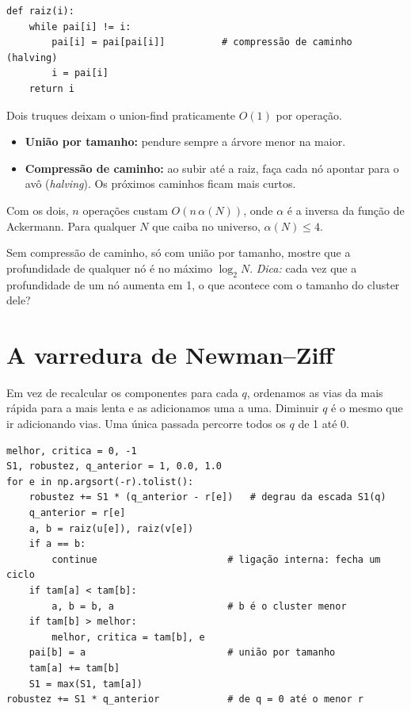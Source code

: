 \documentclass[11pt]{article}
\begin{document}
\begin{lstlisting}
def raiz(i):
    while pai[i] != i:
        pai[i] = pai[pai[i]]          # compressão de caminho (halving)
        i = pai[i]
    return i
\end{lstlisting}

\begin{ideia}
Dois truques deixam o union-find praticamente $O(1)$ por operação.
\begin{itemize}
  \item \textbf{União por tamanho:} pendure sempre a árvore menor na maior.
  \item \textbf{Compressão de caminho:} ao subir até a raiz, faça cada nó apontar para o avô (\emph{halving}). Os próximos caminhos ficam mais curtos.
\end{itemize}
Com os dois, $n$ operações custam $O(n\,\alpha(N))$, onde $\alpha$ é a inversa da função de Ackermann. Para qualquer $N$ que caiba no universo, $\alpha(N)\le4$.
\end{ideia}

 Sem compressão de caminho, só com união por tamanho, mostre que a profundidade de qualquer nó é no máximo $\log_2N$. \emph{Dica:} cada vez que a profundidade de um nó aumenta em 1, o que acontece com o tamanho do cluster dele?

\section{A varredura de Newman--Ziff}

Em vez de recalcular os componentes para cada $q$, ordenamos as vias da mais rápida para a mais lenta e as adicionamos uma a uma. Diminuir $q$ é o mesmo que ir adicionando vias. Uma única passada percorre todos os $q$ de 1 até 0.

\begin{lstlisting}
melhor, critica = 0, -1
S1, robustez, q_anterior = 1, 0.0, 1.0
for e in np.argsort(-r).tolist():
    robustez += S1 * (q_anterior - r[e])   # degrau da escada S1(q)
    q_anterior = r[e]
    a, b = raiz(u[e]), raiz(v[e])
    if a == b:
        continue                       # ligação interna: fecha um ciclo
    if tam[a] < tam[b]:
        a, b = b, a                    # b é o cluster menor
    if tam[b] > melhor:
        melhor, critica = tam[b], e
    pai[b] = a                         # união por tamanho
    tam[a] += tam[b]
    S1 = max(S1, tam[a])
robustez += S1 * q_anterior            # de q = 0 até o menor r
\end{lstlisting}
\end{document}
